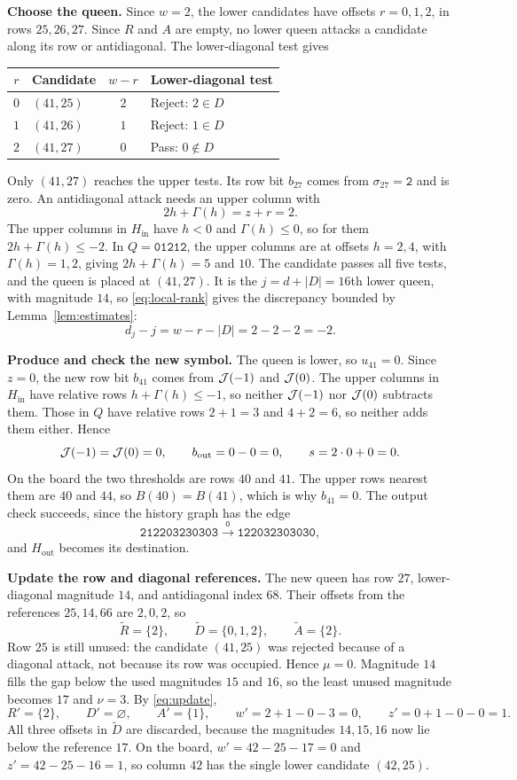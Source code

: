 \medskip\noindent
\textbf{Choose the queen.}
Since $w=2$, the lower candidates have offsets $r=0,1,2$, in rows
$25,26,27$. Since $R$ and $A$ are empty, no lower queen attacks a
candidate along its row or antidiagonal. The lower-diagonal test
gives
\begin{center}
\begin{tabular}{clcl}
\toprule
$r$&Candidate&$w-r$&Lower-diagonal test\\
\midrule
$0$&$(41,25)$&$2$&Reject: $2\in D$\\
$1$&$(41,26)$&$1$&Reject: $1\in D$\\
$2$&$(41,27)$&$0$&Pass: $0\notin D$\\
\bottomrule
\end{tabular}
\end{center}
Only $(41,27)$ reaches the upper tests. Its row bit $b_{27}$ comes
from $\sigma_{27}=\mathtt{2}$ and is zero. An antidiagonal attack needs
an upper column with
\[
 2h+\Gamma(h)=z+r=2.
\]
The upper columns in $H_{\mathrm{in}}$ have $h<0$ and $\Gamma(h)\le0$,
so for them $2h+\Gamma(h)\le-2$. In $Q=\mathtt{01212}$, the upper
columns are at offsets $h=2,4$, with $\Gamma(h)=1,2$, giving
$2h+\Gamma(h)=5$ and $10$. The candidate passes all five tests, and the queen is placed
at $(41,27)$. It is the $j=d+|D|=16$th lower queen, with magnitude
$14$, so \eqref{eq:local-rank} gives the discrepancy bounded by
Lemma~\ref{lem:estimates}:
\[
 d_j-j=w-r-|D|=2-2-2=-2.
\]

\medskip\noindent
\textbf{Produce and check the new symbol.}
The queen is lower, so $u_{41}=0$. Since $z=0$, the new row bit $b_{41}$
comes from $\mathcal J(-1)$ and $\mathcal J(0)$. The upper columns in $H_{\mathrm{in}}$
have relative rows $h+\Gamma(h)\le-1$, so neither $\mathcal J(-1)$ nor
$\mathcal J(0)$ subtracts them. Those in $Q$ have relative rows $2+1=3$ and
$4+2=6$, so neither adds them either. Hence
\[
 \mathcal J(-1)=\mathcal J(0)=0,\qquad
 b_{\mathrm{out}}=0-0=0,\qquad s=2\cdot0+0=0.
\]
On the board the two thresholds are rows $40$ and $41$. The upper
rows nearest them are $40$ and $44$, so $B(40)=B(41)$, which is why
$b_{41}=0$. The output check
succeeds, since the history graph has the edge
\[
 \mathtt{212203230303}\xrightarrow{\;\texttt{0}\;}
 \mathtt{122032303030},
\]
and $H_{\mathrm{out}}$ becomes its destination.

\medskip\noindent
\textbf{Update the row and diagonal references.}
The new queen has row $27$, lower-diagonal magnitude $14$, and
antidiagonal index $68$. Their offsets from the references
$25,14,66$ are $2,0,2$, so
\[
 \widetilde R=\{2\},\qquad
 \widetilde D=\{0,1,2\},\qquad
 \widetilde A=\{2\}.
\]
Row $25$ is still unused: the candidate $(41,25)$ was rejected
because of a diagonal attack, not because its row was occupied.
Hence $\mu=0$. Magnitude $14$ fills the gap below the used
magnitudes $15$ and $16$, so the least unused magnitude becomes $17$
and $\nu=3$. By \eqref{eq:update},
\[
 R'=\{2\},\qquad D'=\varnothing,\qquad A'=\{1\},\qquad
 w'=2+1-0-3=0,\qquad z'=0+1-0-0=1.
\]
All three offsets in $\widetilde D$ are discarded, because the
magnitudes $14,15,16$ now lie below the reference $17$. On the board,
$w'=42-25-17=0$ and $z'=42-25-16=1$, so column $42$ has the single
lower candidate $(42,25)$.

